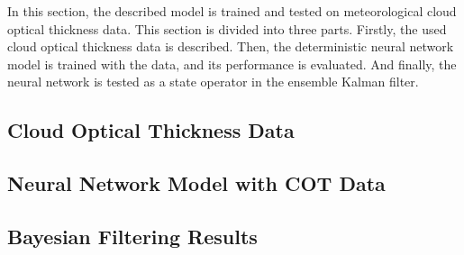 In this section, the described model is trained and tested on meteorological cloud optical thickness data.
This section is divided into three parts.
Firstly, the used cloud optical thickness data is described.
Then, the deterministic neural network model is trained with the data, and its performance is evaluated.
And finally, the neural network is tested as a state operator in the ensemble Kalman filter.

\subsection{Cloud Optical Thickness Data}

\subsection{Neural Network Model with COT Data}

\subsection{Bayesian Filtering Results}

